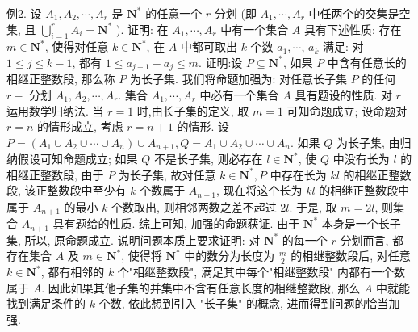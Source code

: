 例2. 设 $A_1, A_2, \cdots, A_r$ 是 $\mathbf{N}^*$ 的任意一个 $r$-分划 (即 $A_1, \cdots, A_r$ 中任两个的交集是空集, 且 $\bigcup_{i=1}^r A_i=\mathbf{N}^*$ ). 证明: 在 $A_1, \cdots, A_r$ 中有一个集合 $A$ 具有下述性质: 存在 $m \in \mathbf{N}^*$, 使得对任意 $k \in \mathbf{N}^*$, 在 $A$ 中都可取出 $k$ 个数 $a_1, \cdots$, $a_k$ 满足: 对 $1 \leqslant j \leqslant k-1$, 都有 $1 \leqslant a_{j+1}-a_j \leqslant m$.
证明:设 $P \subseteq \mathbf{N}^*$, 如果 $P$ 中含有任意长的相继正整数段, 那么称 $P$ 为长子集.
我们将命题加强为: 对任意长子集 $P$ 的任何 $r-$ 分划 $A_1, A_2, \cdots, A_r$. 集合 $A_1, \cdots, A_r$ 中必有一个集合 $A$ 具有题设的性质.
对 $r$ 运用数学归纳法.
当 $r=1$ 时,由长子集的定义, 取 $m=1$ 可知命题成立;
设命题对 $r=n$ 的情形成立, 考虑 $r=n+1$ 的情形.
设 $P=\left(A_1 \cup A_2 \cup \cdots \cup A_n\right) \cup A_{n+1}, Q=A_1 \cup A_2 \cup \cdots \cup A_n$. 如果 $Q$ 为长子集, 由归纳假设可知命题成立; 如果 $Q$ 不是长子集, 则必存在 $l \in \mathbf{N}^*$, 使 $Q$ 中没有长为 $l$ 的相继正整数段, 由于 $P$ 为长子集, 故对任意 $k \in \mathbf{N}^*, P$ 中存在长为 $k l$ 的相继正整数段, 该正整数段中至少有 $k$ 个数属于 $A_{n+1}$, 现在将这个长为 $k l$ 的相继正整数段中属于 $A_{n+1}$ 的最小 $k$ 个数取出, 则相邻两数之差不超过 $2 l$. 于是, 取 $m=2 l$, 则集合 $A_{n+1}$ 具有题给的性质.
综上可知, 加强的命题获证.
由于 $\mathbf{N}^*$ 本身是一个长子集, 所以, 原命题成立.
说明问题本质上要求证明: 对 $\mathbf{N}^*$ 的每一个 $r$-分划而言, 都存在集合 $A$ 及 $m \in \mathbf{N}^*$, 使得将 $\mathbf{N}^*$ 中的数分为长度为 $\frac{m}{2}$ 的相继整数段后, 对任意 $k \in \mathbf{N}^*$, 都有相邻的 $k$ 个"相继整数段", 满足其中每个"相继整数段" 内都有一个数属于 $A$. 因此如果其他子集的并集中不含有任意长度的相继整数段, 那么 $A$ 中就能找到满足条件的 $k$ 个数, 依此想到引入 "长子集" 的概念, 进而得到问题的恰当加强.



